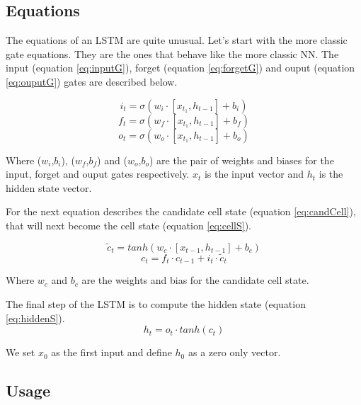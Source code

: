 \subsection{Equations}

The equations of an LSTM are quite unusual.
Let's start with the more classic gate equations. They are the ones that behave like the more classic \ac{NN}.
The input (equation \ref{eq:inputG}), forget (equation \ref{eq:forgetG}) and ouput (equation \ref{eq:ouputG}) gates are described below.

\begin{equation}\label{eq:inputG}
  i_t=\sigma (w_i\cdot[x_{t_1},h_{t-1}] + b_i)
\end{equation}
\begin{equation}\label{eq:forgetG}
  f_t=\sigma (w_f\cdot[x_{t_1},h_{t-1}] + b_f)
\end{equation}
\begin{equation}\label{eq:ouputG}
  o_t=\sigma (w_o\cdot[x_{t_1},h_{t-1}] + b_o)
\end{equation}

Where ($w_i$,$b_i$), ($w_f$,$b_f$) and ($w_o$,$b_o$) are the pair of weights and biases for the input, forget and ouput gates respectively. $x_t$ is the input vector and $h_t$ is the hidden state vector.

For the next equation describes the candidate cell state (equation \ref{eq:candCell}), that will next become the cell state (equation \ref{eq:cellS}).

\begin{equation}\label{eq:candCell}
  \tilde{c}_t=tanh(w_c\cdot[x_{t-1},h_{t-1}] + b_c)
\end{equation}
\begin{equation}\label{eq:cellS}
  c_t=f_t\cdot c_{t-1} + i_t \cdot \tilde{c}_t
\end{equation}

Where $w_c$ and $b_c$ are the weights and bias for the candidate cell state.

The final step of the \ac{LSTM} is to compute the hidden state (equation \ref{eq:hiddenS}).
\begin{equation}\label{eq:hiddenS}
  h_t=o_t\cdot tanh(c_t)
\end{equation}

We set $x_0$ as the first input and define $h_0$ as a zero only vector.

\subsection{Usage}

